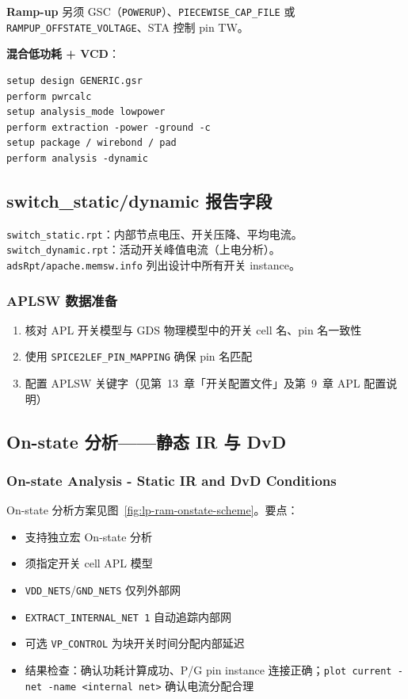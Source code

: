 \textbf{Ramp-up} 另须 GSC（\texttt{POWERUP}）、\texttt{PIECEWISE\_CAP\_FILE} 或 \texttt{RAMPUP\_OFFSTATE\_VOLTAGE}、STA 控制 pin TW。

\textbf{混合低功耗 + VCD}：
\begin{lstlisting}
setup design GENERIC.gsr
perform pwrcalc
setup analysis_mode lowpower
perform extraction -power -ground -c
setup package / wirebond / pad
perform analysis -dynamic
\end{lstlisting}

\subsection{switch\_static/dynamic 报告字段}
\texttt{switch\_static.rpt}：内部节点电压、开关压降、平均电流。\texttt{switch\_dynamic.rpt}：活动开关峰值电流（上电分析）。\texttt{adsRpt/apache.memsw.info} 列出设计中所有开关 instance。


\subsubsection{APLSW 数据准备}
\begin{enumerate}
  \item 核对 APL 开关模型与 GDS 物理模型中的开关 cell 名、pin 名一致性
  \item 使用 \texttt{SPICE2LEF\_PIN\_MAPPING} 确保 pin 名匹配
  \item 配置 APLSW 关键字（见第~13~章「开关配置文件」及第~9~章 APL 配置说明）
\end{enumerate}

\subsection{On-state 分析——静态 IR 与 DvD}
\subsubsection*{On-state Analysis - Static IR and DvD Conditions}

On-state 分析方案见图~\ref{fig:lp-ram-onstate-scheme}。要点：
\begin{itemize}
  \item 支持独立宏 On-state 分析
  \item 须指定开关 cell APL 模型
  \item \texttt{VDD\_NETS}/\texttt{GND\_NETS} 仅列外部网
  \item \texttt{EXTRACT\_INTERNAL\_NET 1} 自动追踪内部网
  \item 可选 \texttt{VP\_CONTROL} 为块开关时间分配内部延迟
  \item 结果检查：确认功耗计算成功、P/G pin instance 连接正确；\texttt{plot current -net -name <internal net>} 确认电流分配合理
\end{itemize}

